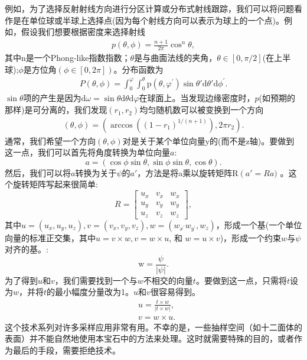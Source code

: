 \begin{CJK}{UTF8}{gbsn}
例如，为了选择反射射线方向进行分区计算或分布式射线跟踪，我们可以将问题看作是在单位球或半球上选择点(因为每个射线方向可以表示为球上的一个点)。例如，假设我们想要根据密度来选择射线
\begin{align}
p(\theta, \phi)=\frac{n+1}{2 \pi} \cos ^{n} \theta,
\end{align}
其中$\mathrm{n}$是一个Phong-like指数指数；$\theta$是与曲面法线的夹角，$\theta \in[0, \pi / 2]$(在上半球);$\phi$是方位角$(\phi \in[0,2 \pi])$。分布函数为
\begin{align}
P(\theta, \phi)=\int_{0}^{\varphi} \int_{0}^{\theta} \mathrm{p}\left(\theta, \varphi^{\prime}\right) \sin \theta' \mathrm{d} \theta' \mathrm{d} \phi^{\prime} .
\end{align}
$\sin \theta$项的产生是因为$\mathrm{d} \omega=\sin \theta \mathrm{d} \theta \mathrm{d} \varphi$在球面上。当发现边缘密度时，$p$(如预期的那样)是可分离的，我们发现$\left(r_{1}, r_{2}\right)$均匀随机数可以被变换到一个方向
\begin{align}
(\theta, \phi)=\left(\arccos \left(\left(1-r_{1}\right)^{1 /(n+1)}\right), 2 \pi r_{2}\right) .
\end{align}
通常，我们希望一个方向$(\theta, \phi)$对是关于某个单位向量$\mathrm{y}$的(而不是$\mathrm{z}$轴)。要做到这一点，我们可以首先将角度转换为单位向量$a$:
$$
a=(\cos \phi \sin \theta, \sin \phi \sin \theta, \cos \theta) .
$$
然后，我们可以将$a$转换为关于$\psi$的$a'$，方法是将a乘以旋转矩阵$\mathrm{R}\left(a'=Ra\right.)$ 。这个旋转矩阵写起来很简单:
$$
R=\begin{bmatrix}
u_{x} & v_{x} & w_{x} \\
u_{y} & v_{y} & w_{y} \\
u_{z} & v_{z} & w_{z}
\end{bmatrix},
$$
其中$u=\left(u_{x}, u_{y}, u_{z}\right), v=\left(v_{x}, v_{y}, v_{z}\right), w=\left(w_{x^{\prime}} w_{y^{\prime}}, w_{z}\right)$，形成一个基(一个单位向量的标准正交集，其中$u=v\times w, v=w\times u$, 和 $w=u\times v$)，形成一个约束$w$与$\psi$对齐的基。:
$$
\mathrm{w}=\frac{\psi}{|\psi|} .
$$
为了得到$u$和$v$，我们需要找到一个与$w$不相交的向量$t$。要做到这一点，只需将$t$设为$w$，并将$t$的最小幅度分量改为1。$u$和$v$很容易得到。
$$
\begin{aligned}
&u=\frac{t \times w}{|t \times w|}, \\
&v=w\times u .
\end{aligned}
$$
这个技术系列对许多采样应用非常有用。不幸的是，一些抽样空间（如十二面体的表面）并不能自然地使用本宝石中的方法来处理。这时就需要特殊的目的，或者作为最后的手段，需要拒绝技术。




\end{CJK}

